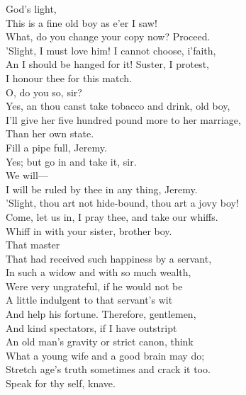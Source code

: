 \documentclass[a4paper,oneside,12pt]{memoir}
\begin{document}
\begin{drama*}
\kastrilspeaks {} God's light,\\
This is a fine old boy as e'er I saw!\\
\lovewitspeaks What, do you change your copy now? Proceed.\\
\kastrilspeaks 'Slight, I must love him! I cannot choose, i'faith,\\
An I should be hanged for it! Suster, I protest,\\
I honour thee for this match.\\
\lovewitspeaks {} O, do you so, sir?\\
\kastrilspeaks Yes, an thou canst take tobacco and drink, old boy,\\
I'll give her five hundred pound more to her marriage,\\
Than her own state.\\
\lovewitspeaks {} Fill a pipe full, Jeremy.\\
\facespeaks Yes; but go in and take it, sir.\\
\lovewitspeaks {} We will---\\
I will be ruled by thee in any thing, Jeremy.\\
\kastrilspeaks 'Slight, thou art not hide-bound, thou art a jovy boy!\\
Come, let us in, I pray thee, and take our whiffs.\\
\lovewitspeaks Whiff in with your sister, brother boy.\\
 That master\\
That had received such happiness by a servant,\\
In such a widow and with so much wealth,\\
Were very ungrateful, if he would not be\\
A little indulgent to that servant's wit\\
And help his fortune. Therefore, gentlemen,\\
And kind spectators, if I have outstript\\
An old man's gravity or strict canon, think\\
What a young wife and a good brain may do;\\
Stretch age's truth sometimes and crack it too.\\
Speak for thy self, knave.\\

\end{drama*}
\end{document}
